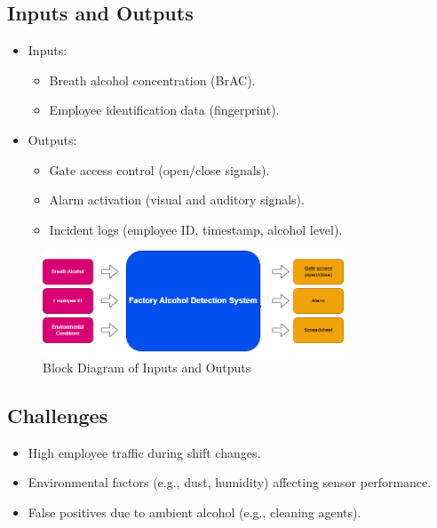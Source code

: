 \documentclass[12pt]{article}
\begin{document}
    \subsection{Inputs and Outputs}
    \begin{itemize}
        \item Inputs:
        \begin{itemize}
            \item Breath alcohol concentration (BrAC).
            \item Employee identification data (fingerprint).
        \end{itemize}
        \item Outputs:
        \begin{itemize}
            \item Gate access control (open/close signals).
            \item Alarm activation (visual and auditory signals).
            \item Incident logs (employee ID, timestamp, alcohol level).
        \end{itemize}
    \end{itemize}

    \begin{figure}[H]
        \centering
        \includegraphics[width=0.8\textwidth]{images/flowChart.png}
        \caption{Block Diagram of Inputs and Outputs}
    \end{figure}

    \subsection{Challenges}
    \begin{itemize}
        \item High employee traffic during shift changes.
        \item Environmental factors (e.g., dust, humidity) affecting sensor performance.
        \item False positives due to ambient alcohol (e.g., cleaning agents).
    \end{itemize}
\end{document}
